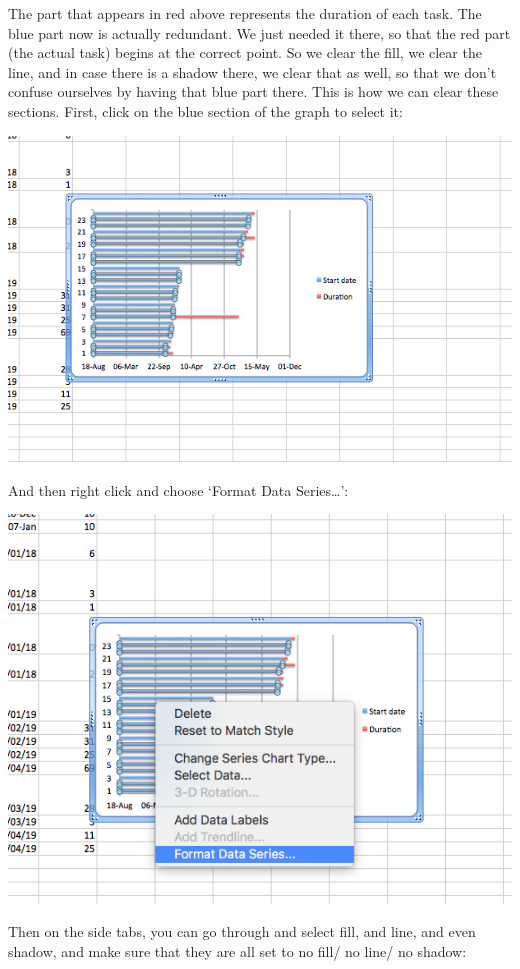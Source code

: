 \documentclass[
]{book}
\begin{document}
The part that appears in red above represents the duration of each task. The blue part now is actually redundant. We just needed it there, so that the red part (the actual task) begins at the correct point. So we clear the fill, we clear the line, and in case there is a shadow there, we clear that as well, so that we don't confuse ourselves by having that blue part there. This is how we can clear these sections. First, click on the blue section of the graph to select it:

\includegraphics{imgs/gantt_select_blue.png}

And then right click and choose `Format Data Series\ldots{}':

\includegraphics{imgs/gantt_format.png}

Then on the side tabs, you can go through and select fill, and line, and even shadow, and make sure that they are all set to no fill/ no line/ no shadow:
\end{document}
